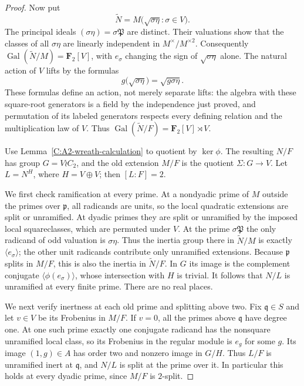 \begin{proof}
Now put
\[
       \widetilde N=M\bigl(\sqrt{\sigma\eta}:\sigma\in V\bigr).
\]
The principal ideals $(\sigma\eta)=\sigma\mathfrak P$ are distinct.
Their valuations show that the classes of all $\sigma\eta$ are
linearly independent in $M^\times/M^{\times2}$. Consequently
$\operatorname{Gal}(\widetilde N/M)=\mathbf F_2[V]$, with $e_\sigma$
changing the sign of $\sqrt{\sigma\eta}$ alone. The natural action
of $V$ lifts by the formulas
\[
 g\bigl(\sqrt{\sigma\eta}\bigr)=\sqrt{g\sigma\eta}.
\]
These formulas define an action, not merely separate lifts: the
algebra with these square-root generators is a field by the
independence just proved, and permutation of its labeled generators
respects every defining relation and the multiplication law of $V$.
Thus $\operatorname{Gal}(\widetilde N/F)=\mathbf F_2[V]\rtimes V$.

Use Lemma~\ref{C:A2-wreath-calculation} to quotient by $\ker\phi$.
The resulting $N/F$ has group $G=V\wr C_2$, and the old extension
$M/F$ is the quotient $\Sigma:G\to V$. Let $L=N^H$, where
$H=V\oplus V$; then $[L:F]=2$.

We first check ramification at every prime. At a nondyadic prime
of $M$ outside the primes over $\mathfrak p$, all radicands are
units, so the local quadratic extensions are split or unramified.
At dyadic primes they are split or unramified by the imposed local
squareclasses, which are permuted under $V$. At the prime
$\sigma\mathfrak P$ the only radicand of odd valuation is
$\sigma\eta$. Thus the inertia group there in
$\widetilde N/M$ is exactly $\langle e_\sigma\rangle$; the other
unit radicands contribute only unramified extensions. Because
$\mathfrak p$ splits in $M/F$, this is also the inertia in
$\widetilde N/F$. In $G$ its image is the complement conjugate
$\langle\phi(e_\sigma)\rangle$, whose intersection with $H$ is
trivial. It follows that $N/L$ is unramified at every finite prime.
There are no real places.

We next verify inertness at each old prime and splitting above two.
Fix $\mathfrak q\in S$ and let $v\in V$ be its Frobenius in $M/F$.
If $v=0$, all the primes above $\mathfrak q$ have degree one. At
one such prime exactly one conjugate radicand has the nonsquare
unramified local class, so its Frobenius in the regular module is
$e_g$ for some $g$. Its image $(1,g)\in A$ has order two and
nonzero image in $G/H$. Thus $L/F$ is unramified inert at
$\mathfrak q$, and $N/L$ is split at the prime over it.
In particular this holds at every dyadic prime, since $M/F$ is
$2$-split.


\end{proof}
